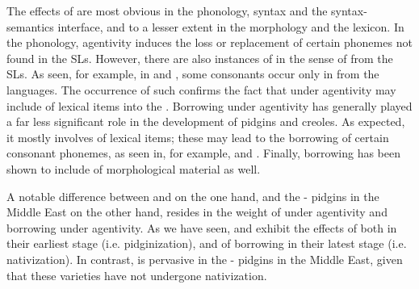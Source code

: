 \documentclass[output=paper]{langsci/langscibook}
\begin{document}
The effects of  are most obvious in the phonology, syntax and the syntax-semantics interface, and to a lesser extent in the morphology and the lexicon. In the phonology,  agentivity induces the loss or replacement of certain phonemes not found in the SLs. However, there are also instances of  in the sense of  from the SLs. As seen, for example, in  and  , some consonants occur only in  from the  languages. The occurrence of such  confirms the fact that  under  agentivity may include  of lexical items into the . Borrowing under  agentivity has generally played a far less significant role in the development of  pidgins and creoles. As expected, it mostly involves  of lexical items; these may lead to the borrowing of certain consonant phonemes, as seen in, for example,   and . Finally, borrowing has been shown to include  of morphological material as well.

A notable difference between   and  on the one hand, and the - pidgins in the Middle East on the other hand, resides in the  weight of  under  agentivity and borrowing under  agentivity. As we have seen,   and  exhibit the effects of both  in their earliest stage (i.e. pidginization), and of borrowing in their latest stage (i.e. nativization). In contrast,  is pervasive in the - pidgins in the Middle East, given that these varieties have not undergone nativization.
\end{document}
